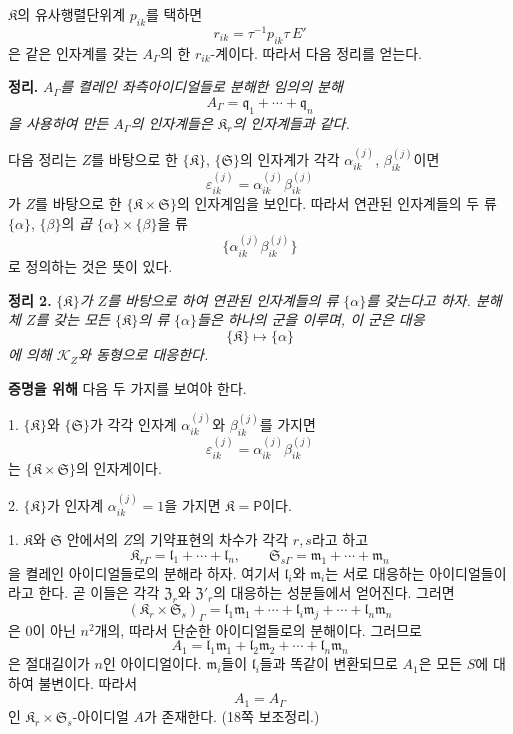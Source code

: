 \(\mathfrak K\)의 유사행렬단위계 \(p_{ik}\)를 택하면
\[
        r_{ik}=\tau^{-1}p_{ik}\tau\,E'
\]
은 같은 인자계를 갖는 \(A_\Gamma\)의 한 \(r_{ik}\)-계이다. 따라서 다음 정리를 얻는다.

\textbf{정리.} \emph{\(A_\Gamma\)를 켤레인 좌측아이디얼들로 분해한 임의의 분해}
\[
        A_\Gamma=\mathfrak q_1+\cdots+\mathfrak q_n
\]
\emph{을 사용하여 만든 \(A_\Gamma\)의 인자계들은 \(\mathfrak K_r\)의 인자계들과 같다.}

다음 정리는 \(Z\)를 바탕으로 한 \(\{\mathfrak K\}\), \(\{\mathfrak S\}\)의 인자계가 각각 \(\alpha_{ik}^{(j)}\), \(\beta_{ik}^{(j)}\)이면
\[
        \varepsilon_{ik}^{(j)}
        =\alpha_{ik}^{(j)}\beta_{ik}^{(j)}
\]
가 \(Z\)를 바탕으로 한 \(\{\mathfrak K\times\mathfrak S\}\)의 인자계임을 보인다. 따라서 연관된 인자계들의 두 류 \(\{\alpha\}\), \(\{\beta\}\)의 \emph{곱 \(\{\alpha\}\times\{\beta\}\)}을 류
\[
        \bigl\{\alpha_{ik}^{(j)}\beta_{ik}^{(j)}\bigr\}
\]
로 정의하는 것은 뜻이 있다.

\textbf{정리 2.} \emph{\(\{\mathfrak K\}\)가 \(Z\)를 바탕으로 하여 연관된 인자계들의 류 \(\{\alpha\}\)를 갖는다고 하자. 분해체 \(Z\)를 갖는 모든 \(\{\mathfrak K\}\)의 류 \(\{\alpha\}\)들은 하나의 군을 이루며, 이 군은 대응}
\[
        \{\mathfrak K\}\longmapsto\{\alpha\}
\]
\emph{에 의해 \(\mathscr K_Z\)와 동형으로 대응한다.}

\textbf{증명을 위해} 다음 두 가지를 보여야 한다.

1. \(\{\mathfrak K\}\)와 \(\{\mathfrak S\}\)가 각각 인자계 \(\alpha_{ik}^{(j)}\)와 \(\beta_{ik}^{(j)}\)를 가지면
\[
        \varepsilon_{ik}^{(j)}
        =\alpha_{ik}^{(j)}\beta_{ik}^{(j)}
\]
는 \(\{\mathfrak K\times\mathfrak S\}\)의 인자계이다.

2. \(\{\mathfrak K\}\)가 인자계 \(\alpha_{ik}^{(j)}=1\)을 가지면 \(\mathfrak K=\mathsf P\)이다.

1. \(\mathfrak K\)와 \(\mathfrak S\) 안에서의 \(Z\)의 기약표현의 차수가 각각 \(r,s\)라고 하고
\[
        \mathfrak K_{r\Gamma}
        =\mathfrak l_1+\cdots+\mathfrak l_n,
        \qquad
        \mathfrak S_{s\Gamma}
        =\mathfrak m_1+\cdots+\mathfrak m_n
\]
을 켤레인 아이디얼들로의 분해라 하자. 여기서 \(\mathfrak l_i\)와 \(\mathfrak m_i\)는 서로 대응하는 아이디얼들이라고 한다. 곧 이들은 각각 \(\mathfrak Z_r\)와 \(\mathfrak Z'_r\)의 대응하는 성분들에서 얻어진다. 그러면
\[
 (\mathfrak K_r\times\mathfrak S_s)_\Gamma
 =\mathfrak l_1\mathfrak m_1+
  \cdots+
  \mathfrak l_i\mathfrak m_j+
  \cdots+
  \mathfrak l_n\mathfrak m_n
\]
은 \(0\)이 아닌 \(n^2\)개의, 따라서 단순한 아이디얼들로의 분해이다. 그러므로
\[
        A_1
        =\mathfrak l_1\mathfrak m_1+
         \mathfrak l_2\mathfrak m_2+
         \cdots+
         \mathfrak l_n\mathfrak m_n
\]
은 절대길이가 \(n\)인 아이디얼이다. \(\mathfrak m_i\)들이 \(\mathfrak l_i\)들과 똑같이 변환되므로 \(A_1\)은 모든 \(S\)에 대하여 불변이다. 따라서
\[
        A_1=A_\Gamma
\]
인 \(\mathfrak K_r\times\mathfrak S_s\)-아이디얼 \(A\)가 존재한다. (18쪽 보조정리.)

